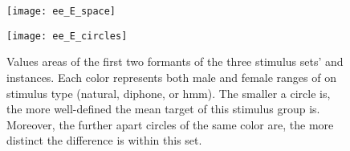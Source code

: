 %
\begin{figure}[t]
	\centering
	\begin{minipage}{.47\linewidth}
		\centering
		\texttt{[image: ee\_E\_space]}
		\caption[Example of vowel quality convergence towards a model speaker]
			{An example of a participant's vowel quality convergence towards the stimuli.
			The participant's preference is \textipa{[e:]} while the variation \textipa{[E:]} is used in the stimuli (and cf.\ \cref{fig:ee_E_circles}).
			The colors of the circles represent the {\color{base-green}\textbf{base}}, {\color{shadow-red}\textbf{shadow}}, and {\color{post-blue}\textbf{post}} phases, and the model's formant values with $\pm1$ standard deviation from the bivariate mean.
			The arrow shows the distance between one of the participant's production and the {\color{model-orange}\textbf{model mean}}.}
		\label{fig:ee_E_space}
	\end{minipage}
	\hfill
	\begin{minipage}{.47\linewidth}
		\centering
		\texttt{[image: ee\_E\_circles]}
		\caption[F1 and F2 value areas of all stimulus groups]
			{Values areas of the first two formants of the three stimulus sets' \textipa{[e:]} and \textipa{[E:]} instances.
			 Each color represents both male and female ranges of on stimulus type (natural, diphone, or \ac{hmm}).
			 The smaller a circle is, the more well-defined the mean target of this stimulus group is.
			 Moreover, the further apart circles of the same color are, the more distinct the difference is within this set.}
		\label{fig:ee_E_circles}
	\end{minipage}	
\end{figure}

